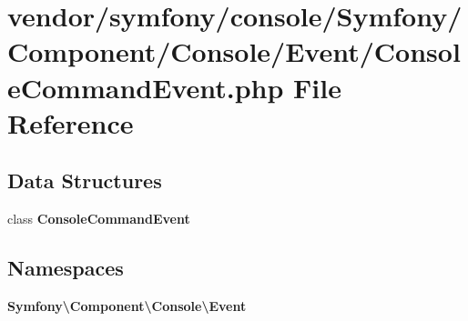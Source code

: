 \section{vendor/symfony/console/\+Symfony/\+Component/\+Console/\+Event/\+Console\+Command\+Event.php File Reference}
\label{_console_command_event_8php}
\subsection*{Data Structures}
\begin{DoxyCompactItemize}
\item 
class {\bf Console\+Command\+Event}
\end{DoxyCompactItemize}
\subsection*{Namespaces}
\begin{DoxyCompactItemize}
\item 
 {\bf Symfony\textbackslash{}\+Component\textbackslash{}\+Console\textbackslash{}\+Event}
\end{DoxyCompactItemize}
